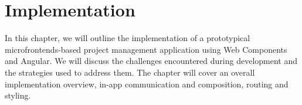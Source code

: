 \chapter{Implementation}
\label{chap:Implementation}
In this chapter, we will outline the implementation of a prototypical microfrontends-based project management application using Web Components and Angular. We will discuss the challenges encountered during development and the strategies used to address them. The chapter will cover an overall implementation overview, in-app communication and composition, routing and styling.





